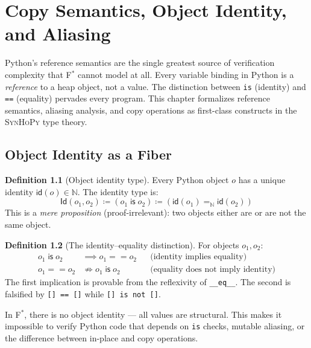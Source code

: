 \documentclass[11pt,a4paper]{report}
\theoremstyle{definition}
\newtheorem{definition}{Definition}[chapter]
\theoremstyle{plain}
\newcommand{\defeq}{\coloneqq}
\newcommand{\fstar}{F$^{*}$}
\newcommand{\synhopy}{\textsc{SynHoPy}}
\begin{document}

\chapter{Copy Semantics, Object Identity, and Aliasing}
\label{ch:copy-aliasing}

Python's reference semantics are the single greatest source of verification
complexity that \fstar{} cannot model at all.  Every variable binding in Python
is a \emph{reference} to a heap object, not a value.  The distinction between
\lstinline[style=python]{is} (identity) and \lstinline[style=python]{==}
(equality) pervades every program.  This chapter formalizes reference semantics,
aliasing analysis, and copy operations as first-class constructs in the
\synhopy{} type theory.

\section{Object Identity as a Fiber}

\begin{definition}[Object identity type]
Every Python object $o$ has a unique identity $\mathsf{id}(o) \in \mathbb{N}$.
The identity type is:
\[
  \mathsf{Id}(o_1, o_2) \defeq (o_1 \;\mathsf{is}\; o_2) \defeq (\mathsf{id}(o_1) =_{\mathbb{N}} \mathsf{id}(o_2))
\]
This is a \emph{mere proposition} (proof-irrelevant): two objects either are or are not the same object.
\end{definition}

\begin{definition}[The identity--equality distinction]
For objects $o_1, o_2$:
\begin{align}
  o_1 \;\mathsf{is}\; o_2 &\implies o_1 == o_2 && \text{(identity implies equality)} \\
  o_1 == o_2 &\not\Rightarrow o_1 \;\mathsf{is}\; o_2 && \text{(equality does not imply identity)}
\end{align}
The first implication is provable from the reflexivity of \lstinline[style=python]{__eq__}.
The second is falsified by \lstinline[style=python]{[] == []} while
\lstinline[style=python]{[] is not []}.
\end{definition}

In \fstar{}, there is no object identity --- all values are structural.
This makes it impossible to verify Python code that depends on \lstinline[style=python]{is}
checks, mutable aliasing, or the difference between in-place and copy operations.
\end{document}
